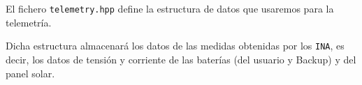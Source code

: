 
El fichero \texttt{telemetry.hpp} define la estructura de datos que usaremos para la telemetría.

Dicha estructura almacenará los datos de las medidas obtenidas por los \texttt{INA}, es decir, los datos de tensión y corriente de las baterías (del usuario y Backup) y del panel solar.

